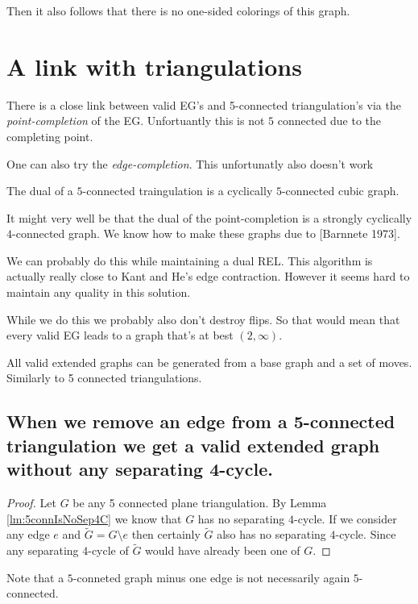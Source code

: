   Then it also follows that there is no one-sided colorings of this graph.


\section{A link with triangulations}

  There is a close link between valid EG's and 5-connected triangulation's via the \emph{point-completion} of the EG. Unfortuantly this is not $5$ connected due to the completing point.


  One can also try the \emph{edge-completion}. This unfortunatly also doesn't work

  The dual of a $5$-connected traingulation is a cyclically $5$-connected cubic graph.

  It might very well be that the dual of the point-completion is a strongly cyclically $4$-connected graph. We know how to make these graphs due to [Barnnete 1973].

  We can probably do this while maintaining a dual REL. This algorithm is actually really close to Kant and He's edge contraction. However it seems hard to maintain any quality in this solution.

  While we do this we probably also don't destroy flips. So that would mean that every valid EG leads to a graph that's at best $(2, \infty)$.


  \begin{con}
    All valid extended graphs can be generated from a base graph and a set of moves. Similarly to 5 connected triangulations.
  \end{con}


  \subsection{When we remove an edge from a 5-connected triangulation we get a valid extended graph without any separating 4-cycle.}

  \begin{proof}
    Let $G$ be any 5 connected plane triangulation. By Lemma \ref{lm:5connIsNoSep4C} we know that $G$ has no separating $4$-cycle. If we consider any edge $e$ and $\tilde{G} = G \setminus{e}$ then certainly $\tilde{G}$ also has no separating $4$-cycle. Since any separating $4$-cycle of $\tilde{G}$ would have already been one of $G$.
  \end{proof}

  Note that a $5$-conneted graph minus one edge is not necessarily again $5$-connected.

